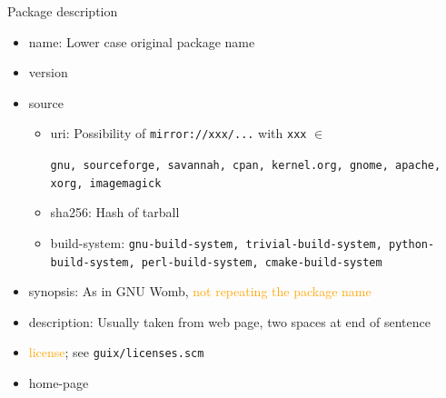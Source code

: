 \documentclass [t]{beamer}
\begin{document}
\begin {frame}{Package description}
\begin {itemize}
\item
name: Lower case original package name
\item
version
\item
source
\begin {itemize}
\item
uri: Possibility of \texttt {mirror://xxx/...} with \texttt {xxx} $\in$

\texttt {gnu, sourceforge, savannah, cpan, kernel.org, gnome, apache, xorg, imagemagick}
\item
sha256: Hash of tarball
\item
build-system:
\texttt {gnu-build-system, trivial-build-system, python-build-system, perl-build-system,
cmake-build-system}
\end {itemize}
\item
synopsis: As in GNU Womb, \textcolor {orange}{not repeating the package name}
\item
description: Usually taken from web page, two spaces at end of sentence
\item
\textcolor {orange}{license}; see \texttt {guix/licenses.scm}
\item
home-page
\end {itemize}
\end {frame}
\end{document}
